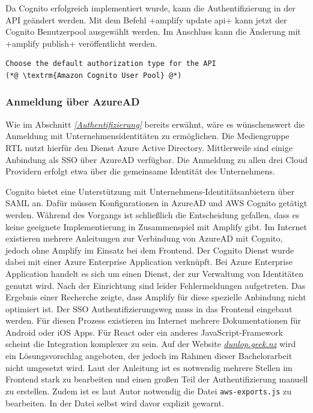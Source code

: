 Da Cognito erfolgreich implementiert wurde, kann die Authentifizierung in der API geändert werden.
Mit dem Befehl \spverb+amplify update api+ kann jetzt der Cognito Benutzerpool ausgewählt werden.
Im Anschluss kann die Änderung mit \spverb+amplify publish+ veröffentlicht werden.
\\
\begin{lstlisting}[basicstyle=\ttfamily\small, breaklines=true , frame = single, backgroundcolor=\color{flashwhite}, caption={Auszug aws-exports.js} ]
Choose the default authorization type for the API
(*@ \textrm{Amazon Cognito User Pool} @*)
\end{lstlisting}



\subsubsection{Anmeldung über AzureAD}

Wie im Abschnitt \textit{\ref{Authentifizierung} } bereits erwähnt, wäre es wünschenswert die Anmeldung mit Unternehmensidentitäten zu ermöglichen.
Die Mediengruppe RTL nutzt hierfür den Dienst Azure Active Directory.
Mittlerweile sind einige Anbindung als SSO über AzureAD verfügbar.
Die Anmeldung zu allen drei Cloud Providern erfolgt etwa über die gemeinsame Identität des Unternehmens.

Cognito bietet eine Unterstützung mit Unternehmens-Identitätsanbietern über SAML an.
Dafür müssen Konfigurationen in AzureAD und AWS Cognito getätigt werden.
Während des Vorgangs ist schließlich die Entscheidung gefallen, dass es keine geeignete Implementierung in Zusammenspiel mit Amplify gibt.
Im Internet existieren mehrere Anleitungen zur Verbindung von AzureAD mit Cognito, jedoch ohne Amplify im Einsatz bei dem Frontend.
Der Cognito Dienst wurde dabei mit einer \glqq Azure Enterprise Application\grqq{} verknüpft.
Bei \glqq Azure Enterprise Application\grqq{} handelt es sich um einen Dienst, der zur Verwaltung von Identitäten genutzt wird.
Nach der Einrichtung sind leider Fehlermeldungen aufgetreten.
Das Ergebnis einer Recherche zeigte, dass Amplify für diese spezielle Anbindung nicht optimiert ist.
Der SSO Authentifizierungsweg muss in das Frontend eingebaut werden.
Für diesen Prozess existieren im Internet mehrere Dokumentationen für Android oder iOS Apps.
Für React oder ein anderes JavaScript-Framework scheint die Integration komplexer zu sein.
Auf der Website \textit{\href{https://dunlop.geek.nz/aws-cognito-azure-ad-react-amplify/}{dunlop.geek.nz}} wird ein Lösungsvorschlag angeboten, der jedoch im Rahmen dieser Bachelorarbeit nicht umgesetzt wird.
Laut der Anleitung ist es notwendig mehrere Stellen im Frontend stark zu bearbeiten und einen großen Teil der Authentifizierung manuell zu erstellen.
Zudem ist es laut Autor notwendig die Datei \verb+aws-exports.js+ zu bearbeiten.
In der Datei selbst wird davor explizit gewarnt.

